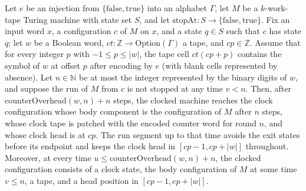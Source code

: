 \begin{theorem}
\label{Turing.sc_rounds}
\leanok
{}
Let $e$ be an injection from $\{\mathrm{false},\mathrm{true}\}$ into an alphabet
$\Gamma$, let $M$ be a $k$-work-tape Turing machine with state set $S$, and let
$\mathrm{stopAt}:S\to\{\mathrm{false},\mathrm{true}\}$. Fix an input word $x$, a
configuration $c$ of $M$ on $x$, and a state $q\in S$ such that $c$ has state $q$; let
$w$ be a Boolean word, $ct:\mathbb Z\to\mathrm{Option}(\Gamma)$ a tape, and
$cp\in\mathbb Z$. Assume that for every integer $p$ with $-1\le p\le |w|$, the tape
cell $ct(cp+p)$ contains the symbol of $w$ at offset $p$ after encoding by $e$ (with
blank cells represented by absence). Let $n\in\mathbb N$ be at most the integer
represented by the binary digits of $w$, and suppose the run of $M$ from $c$ is not
stopped at any time $v<n$. Then, after $\mathrm{counterOverhead}(w,n)+n$ steps, the
clocked machine reaches the clock configuration whose body component is the
configuration of $M$ after $n$ steps, whose clock tape is patched with the encoded
counter word for round $n$, and whose clock head is at $cp$. The run segment up to that
time avoids the exit states before its endpoint and keeps the clock head in
$[cp-1,cp+|w|]$ throughout. Moreover, at every time $u\le
\mathrm{counterOverhead}(w,n)+n$, the clocked configuration consists of a clock state,
the body configuration of $M$ at some time $v\le n$, a tape, and a head position in
$[cp-1,cp+|w|]$.
\end{theorem}

